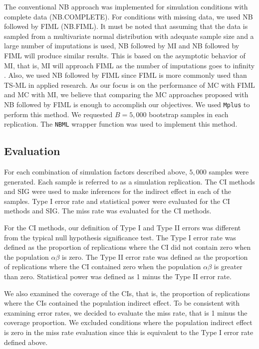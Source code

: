 \documentclass[man]{apa7}\usepackage[]{graphicx}\usepackage[]{xcolor}
\begin{document}
The conventional NB approach was implemented for simulation conditions with complete data (NB.COMPLETE).
For conditions with missing data,
we used NB followed by FIML (NB.FIML).
It must be noted that assuming that the data is sampled from a multivariate normal distribution with adequate sample size
and a large number of imputations is used,
NB followed by MI and NB followed by FIML will produce similar results.
This is based on the asymptotic behavior of MI,
that is,
MI will approach FIML as the number of imputations goes to infinity
\parencite{Lib-Missing-Data-Multiple-Imputation-Graham-2007}.
Also,
we used NB followed by FIML since FIML is more commonly used than TS-ML in applied research.
As our focus is on the performance of MC with FIML and MC with MI,
we believe that comparing the MC approaches proposed with NB followed by FIML
is enough to accomplish our objectives.
We used \texttt{Mplus} to perform this method.
We requested $B = 5,000$ bootstrap samples in each replication.
The \texttt{NBML} wrapper function was used to implement this method.

\subsection{Evaluation}

For each combination of simulation factors described above,
$5,000$ samples were generated.
Each sample is referred to as a simulation replication.
The CI methods and SIG were used to 
make inferences for the indirect effect in each of the samples.
Type I error rate and statistical power
were evaluated for the CI methods and SIG.
The miss rate was evaluated for the CI methods.

For the CI methods,
our definition of Type I and Type II errors was different from the typical null hypothesis significance test.
The Type I error rate was defined as the proportion of replications
where the CI did not contain zero
when the population $\alpha \beta$ is zero.
The Type II error rate was defined as the proportion of replications
where the CI contained zero
when the population $\alpha \beta$ is greater than zero.
Statistical power was defined as 1 minus the Type II error rate.

We also examined the coverage of the CIs,
that is,
the proportion of replications where the CIs
contained the population indirect effect.
To be consistent with examining error rates,
we decided to evaluate the miss rate,
that is 1 minus the coverage proportion.
We excluded conditions where the population indirect effect is zero
in the miss rate evaluation since this is equivalent to the Type I error rate defined above.
\end{document}
